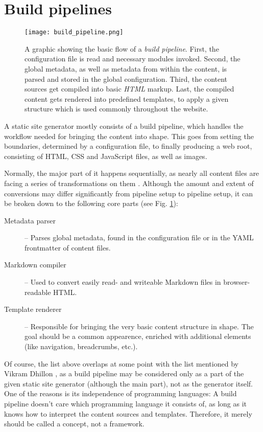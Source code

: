 \section{Build pipelines}
\label{sec:buildpipelines}

\begin{figure} %
    \centering
    \texttt{[image: build\_pipeline.png]}
    \caption{A graphic showing the basic flow of a \emph{build pipeline}. First, the configuration file is read and necessary modules invoked. Second, the global metadata, as well as metadata from within the content, is parsed and stored in the global configuration. Third, the content sources get compiled into basic \emph{HTML} markup. Last, the compiled content gets rendered into predefined templates, to apply a given structure which is used commonly throughout the website.}
    \label{fig:build-pipeline}
\end{figure}
%

A static site generator mostly consists of a build pipeline, which handles the workflow needed for bringing the content into shape. This goes from setting the boundaries, determined by a configuration file, to finally producing a web root, consisting of HTML, CSS and JavaScript files, as well as images.

Normally, the major part of it happens sequentially, as nearly all content files are facing a series of transformations on them \cite{Metalsmith2015technicaldocumentation}. Although the amount and extent of conversions may differ significantly from pipeline setup to pipeline setup, it can be broken down to the following core parts (see Fig. \ref{fig:build-pipeline}):

\begin{description}
  \item[Metadata parser] -- Parses global metadata, found in the configuration file or in the YAML frontmatter of content files.
  \item[Markdown compiler] -- Used to convert easily read- and writeable Markdown files in browser-readable HTML.
  \item[Template renderer] -- Responsible for bringing the very basic content structure in shape. The goal should be a common appearence, enriched with additional elements (like navigation, breadcrumbs, etc.).
\end{description}
Of course, the list above overlaps at some point with the list mentioned by Vikram Dhillon \cite[24]{dhillon2016}, as a build pipeline may be considered only as a part of the given static site generator (although the main part), not as the generator itself. One of the reasons is its independence of programming languages: A build pipeline doesn't care which programming language it consists of, as long as it knows how to interpret the content sources and templates. Therefore, it merely should be called a concept, not a framework.


